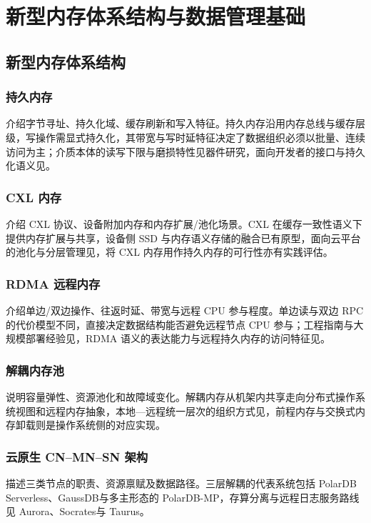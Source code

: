 \chapter{新型内存体系结构与数据管理基础}

\section{新型内存体系结构}
\subsection{持久内存}
介绍字节寻址、持久化域、缓存刷新和写入特征。持久内存沿用内存总线与缓存层级，写操作需显式持久化，其带宽与写时延特征决定了数据组织必须以批量、连续访问为主\cite{izraelevitzBasic2019,yangEmpirical2020,xiangCharacterizing2022,wangCharacterizing2020}；介质本体的读写下限与磨损特性见器件研究\cite{leeArchitecting2009,wongPhase2010,hadyPlatform2017}，面向开发者的接口与持久化语义见\cite{scargallProgramming2020}。
\subsection{CXL 内存}
介绍 CXL 协议、设备附加内存和内存扩展/池化场景。CXL 在缓存一致性语义下提供内存扩展与共享\cite{cxlConsortium2025}，设备侧 SSD 与内存语义存储的融合已有原型\cite{jungHello2022,kwonCache2023}，面向云平台的池化与分层管理见\cite{liPond2023,zhongManaging2024}，将 CXL 内存用作持久内存的可行性亦有实践评估\cite{fridmanCxl2023,goukDirectcxl2022}。
\subsection{RDMA 远程内存}
介绍单边/双边操作、往返时延、带宽与远程 CPU 参与程度。单边读与双边 RPC 的代价模型不同，直接决定数据结构能否避免远程节点 CPU 参与\cite{kaliaUsing2014,kaliaFasst2016,mitchellUsing2013}；工程指南与大规模部署经验见\cite{kaliaDesign2016,guoRdma2016}，RDMA 语义的表达能力与远程持久内存的访问特征见\cite{redaRdma2022,weiCharacterizing2021}。
\subsection{解耦内存池}
说明容量弹性、资源池化和故障域变化。解耦内存从机架内共享\cite{limDisaggregated2009}走向分布式操作系统视图\cite{shanLeGo2018}和远程内存抽象\cite{aguileraRemote2018,guoClio2022}，本地—远程统一层次的组织方式见\cite{zhongUnimem2024}，前程内存与交换式内存卸载则是操作系统侧的对应实现\cite{guEfficient2017,amaroCan2020,ruanAifm2020}。
\subsection{云原生 CN--MN--SN 架构}
描述三类节点的职责、资源禀赋及数据路径。三层解耦的代表系统包括 PolarDB Serverless\cite{caoPolardb2021}、GaussDB\cite{liGaussdb2024}与多主形态的 PolarDB-MP\cite{yangPolardb2024}，存算分离与远程日志服务路线见 Aurora\cite{verbitskiAmazon2017}、Socrates\cite{antonopoulosSocrates2019}与 Taurus\cite{depoutovitchTaurus2023}。

